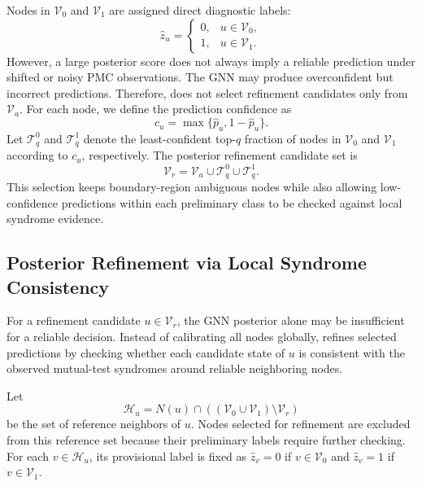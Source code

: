 Nodes in $\mathcal{V}_{0}$ and $\mathcal{V}_{1}$ are assigned direct diagnostic labels:
\begin{equation*}
\hat{z}_u=
\begin{cases}
0, & u\in \mathcal{V}_{0},\\
1, & u\in \mathcal{V}_{1}.
\end{cases}
\end{equation*}
However, a large posterior score does not always imply a reliable prediction under shifted or noisy PMC observations. The GNN may produce overconfident but incorrect predictions. Therefore, \tool does not select refinement candidates only from $\mathcal{V}_{a}$. For each node, we define the prediction confidence as
\begin{equation*}
c_u=\max\{\hat{p}_u,1-\hat{p}_u\}.
\end{equation*}
Let $\mathcal{T}_{q}^{0}$ and $\mathcal{T}_{q}^{1}$ denote the least-confident top-$q$ fraction of nodes in $\mathcal{V}_{0}$ and $\mathcal{V}_{1}$ according to $c_u$, respectively. The posterior refinement candidate set is
\begin{equation*}
\mathcal{V}_{r}=\mathcal{V}_{a}\cup\mathcal{T}_{q}^{0}\cup\mathcal{T}_{q}^{1}.
\end{equation*}
This selection keeps boundary-region ambiguous nodes while also allowing low-confidence predictions within each preliminary class to be checked against local syndrome evidence.

\subsection{Posterior Refinement via Local Syndrome Consistency}
\label{subsec:posterior_calibration}

For a refinement candidate $u\in\mathcal{V}_{r}$, the GNN posterior alone may be insufficient for a reliable decision. Instead of calibrating all nodes globally, \tool refines selected predictions by checking whether each candidate state of $u$ is consistent with the observed mutual-test syndromes around reliable neighboring nodes.

Let
\begin{equation*}
\mathcal{H}_u=N(u)\cap((\mathcal{V}_{0}\cup\mathcal{V}_{1})\setminus\mathcal{V}_{r})
\end{equation*}
be the set of reference neighbors of $u$. Nodes selected for refinement are excluded from this reference set because their preliminary labels require further checking. For each $v\in\mathcal{H}_u$, its provisional label is fixed as $\hat{z}_v=0$ if $v\in\mathcal{V}_{0}$ and $\hat{z}_v=1$ if $v\in\mathcal{V}_{1}$.

